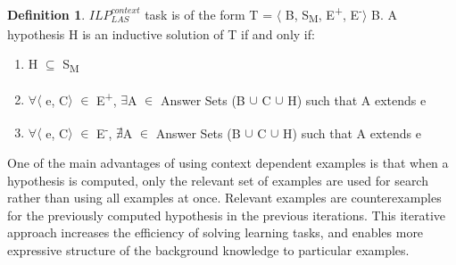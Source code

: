 \documentclass[11pt,twoside]{report}
\theoremstyle{plain}
\theoremstyle{definition}
\newtheorem{defn}[thm]{Definition} %
\begin{document}
%
\begin{defn} \label{def:las_context}
$ILP_{LAS}^{context}$ task is of the form T = $\langle$ B, S\textsubscript{M}, E\textsuperscript{+}, E\textsuperscript{-}$\rangle$ B.
A hypothesis H is an inductive solution of T if and only if:
\begin{enumerate}
\item H $\subseteq$ S\textsubscript{M}
\item $\forall$$\langle$ e, C$\rangle$ $\in$ E\textsuperscript{+}, $\exists$A $\in$ Answer Sets (B $\cup$ C $\cup$ H) such that A extends e
\item $\forall$$\langle$ e, C$\rangle$ $\in$ E\textsuperscript{-}, $\nexists$A $\in$ Answer Sets (B $\cup$ C $\cup$ H) such that A extends e
\end{enumerate}
\end{defn}
One of the main advantages of using context dependent examples is that when a hypothesis is computed, only the relevant set of examples are used for search rather than using all examples at once. 
Relevant examples are counterexamples for the previously computed hypothesis in the previous iterations. This iterative approach increases the efficiency of solving learning tasks, and enables more expressive structure of the background knowledge to particular examples. 
\end{document}
